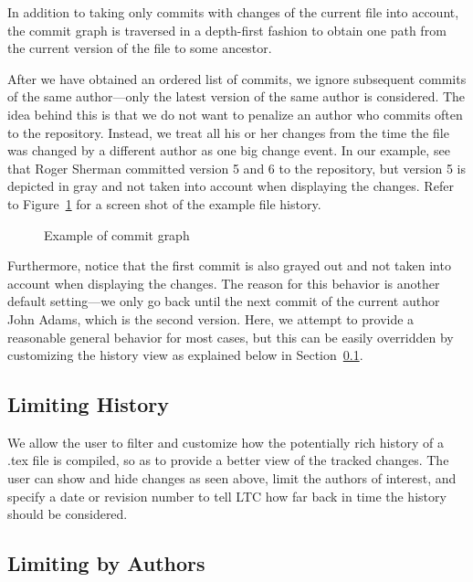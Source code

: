 In addition to taking only commits with changes of the current file into account, the commit graph is traversed in a depth-first fashion to obtain one path from the current version of the file to some ancestor.  

After we have obtained an ordered list of commits, we ignore subsequent commits of the same author---only the latest version of the same author is considered.  The idea behind this is that we do not want to penalize an author who commits often to the repository.  Instead, we treat all his or her changes from the time the file was changed by a different author as one big change event.  In our example, see that Roger Sherman committed version 5 and 6 to the repository, but version 5 is depicted in gray and not taken into account when displaying the changes.  Refer to Figure~\ref{fig:commit-graph} for a screen shot of the example file history.
\begin{figure}[t]
\centering
{}
\caption{Example of commit graph} \label{fig:commit-graph}
\end{figure}
Furthermore, notice that the first commit is also grayed out and not taken into account when displaying the changes.  The reason for this behavior is another default setting---we only go back until the next commit of the current author John Adams, which is the second version.  Here, we attempt to provide a reasonable general behavior for most cases, but this can be easily overridden by customizing the history view as explained below in Section~\ref{sec:limit-history}.

\subsection{Limiting History} \label{sec:limit-history}

We allow the user to filter and customize how the potentially rich history of a .tex file is compiled, so as to provide a better view of the tracked changes.  The user can show and hide changes as seen above, limit the authors of interest, and specify a date or revision number to tell LTC how far back in time the history should be considered.

\subsection{Limiting by Authors}

